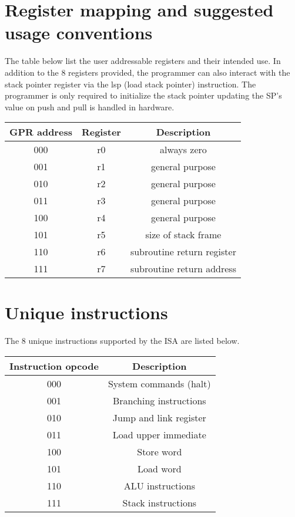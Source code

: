 \documentclass{article}
\begin{document}
\section{Register mapping and suggested usage conventions}
\label{regmap}
\begin{par}
	The table below list the user addressable registers and their intended use. In addition to the 8 registers provided, the programmer can also interact with the stack pointer register via the lsp (load stack pointer) instruction. The programmer is only required to initialize the stack pointer updating the SP's value on push and pull is handled in hardware. 
	\begin{center}
		\begin{tabular}{|c|c|c|}
			\hline
			\textbf{GPR address} & \textbf{Register} & \textbf{Description} \\
			\hline 
			000 & r0 & always zero \\
			\hline 
			001 & r1 & general purpose \\
			\hline 
			010 & r2 & general purpose \\
			\hline 
			011 & r3 & general purpose \\
			\hline 
			100 & r4 & general purpose \\
			\hline 
			101 & r5 & size of stack frame \\
			\hline 
			110 & r6 & subroutine return register \\
			\hline 
			111 & r7 & subroutine return address \\
			\hline 
		\end{tabular}
	\end{center}		
\end{par}

\newpage

\section{Unique instructions}
\label{uins}
\begin{par}
	The 8 unique instructions supported by the ISA are listed below. 
	\begin{center}
		\begin{tabular}{|c|c|}
			\hline
			\textbf{Instruction opcode} & \textbf{Description} \\
			\hline 
			000 & System commands (halt) \\
			\hline 
			001 & Branching instructions \\
			\hline
			010 & Jump and link register \\
			\hline
			011 & Load upper immediate \\
			\hline
			100 & Store word \\
			\hline
			101 & Load word \\
			\hline
			110 & ALU instructions \\
			\hline
			111 & Stack instructions \\
			\hline
		\end{tabular}
	\end{center}
	
\end{par}
\end{document}
